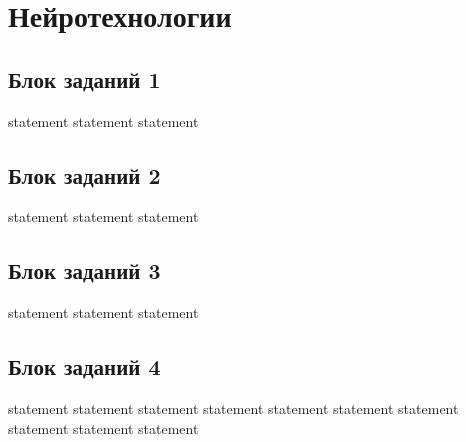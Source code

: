 \chapter{Нейротехнологии}

\section{Блок заданий 1}

{statement}
{statement}
{statement}

\section{Блок заданий 2}

{statement}
{statement}
{statement}

\section{Блок заданий 3}

{statement}
{statement}
{statement}

\section{Блок заданий 4}

{statement}
{statement}
{statement}
{statement}
{statement}
{statement}
{statement}
{statement}
{statement}
{statement}
